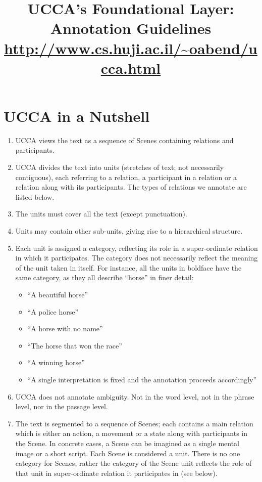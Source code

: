 \documentclass[11pt]{article}
\title{UCCA's Foundational Layer:  Annotation 	Guidelines \\
\url{http://www.cs.huji.ac.il/~oabend/ucca.html}}
\begin{document}
\maketitle
\tableofcontents

\newpage
\section{\large UCCA in a Nutshell}

\begin{enumerate}

\item
UCCA views the text as a sequence of Scenes containing relations and participants.
\item
UCCA divides the text into units (stretches of text; not necessarily contiguous), each referring to a relation, a participant in a relation or a relation along with its participants. The types of relations we annotate are listed below.
\item
The units must cover all the text (except punctuation).
\item
Units may contain other sub-units, giving rise to a hierarchical structure.
\item
Each unit is assigned a category, reflecting its role in a super-ordinate relation in which it participates. The category does not necessarily reflect the meaning of the unit taken in itself. For instance, all the units in boldface have the same category, as they all describe ``horse'' in finer detail:

\begin{itemize}
\item
``A beautiful horse''
\item
``A police horse''
\item
``A horse with no name''
\item
``The horse that won the race''
\item
``A winning horse''
\item
``A single interpretation is fixed and the annotation proceeds accordingly''
\end{itemize}

\item
UCCA does not annotate ambiguity. Not in the word level, not in the phrase level, nor in the passage level.

\item
The text is segmented to a sequence of Scenes; each contains a main relation which is either an action, a movement or a state along with participants in the Scene. In concrete cases, a Scene can be imagined as a single mental image or a short script. Each Scene is considered a unit. There is no one category for Scenes, rather the category of the Scene unit reflects the role of that unit in super-ordinate relation it participates in (see below).


\end{enumerate}
\end{document}
